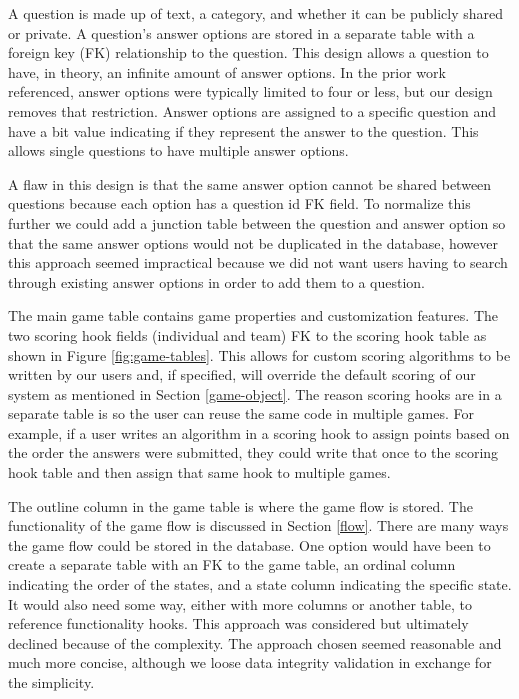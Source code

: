 \documentclass{article}
\begin{document}
    		A question is made up of text, a category, and whether it can be publicly shared or private. A question's answer options are stored in a separate table with a foreign key (FK) relationship to the question. This design allows a question to have, in theory, an infinite amount of answer options. In the prior work referenced, answer options were typically limited to four or less, but our design removes that restriction. Answer options are assigned to a specific question and have a bit value indicating if they represent the answer to the question. This allows single questions to have multiple answer options.
    		\smallskip
    		
    		A flaw in this design is that the same answer option cannot be shared between questions because each option has a question id FK field.  To normalize this further we could add a junction table between the question and answer option so that the same answer options would not be duplicated in the database, however this approach seemed impractical because we did not want users having to search through existing answer options in order to add them to a question.
    		\smallskip
    		
    		The main game table contains game properties and customization features. The two scoring hook fields (individual and team) FK to the scoring hook table as shown in Figure \ref{fig:game-tables}. This allows for custom scoring algorithms to be written by our users and, if specified, will override the default scoring of our system as mentioned in Section \ref{game-object}. The reason scoring hooks are in a separate table is so the user can reuse the same code in multiple games. For example, if a user writes an algorithm in a scoring hook to assign points based on the order the answers were submitted, they could write that once to the scoring hook table and then assign that same hook to multiple games.
    		\smallskip
    		
    		The outline column in the game table is where the game flow is stored. The functionality of the game flow is discussed in Section \ref{flow}. There are many ways the game flow could be stored in the database. One option would have been to create a separate table with an FK to the game table, an ordinal column indicating the order of the states, and a state column indicating the specific state. It would also need some way, either with more columns or another table, to reference functionality hooks. This approach was considered but ultimately declined because of the complexity. The approach chosen seemed reasonable and much more concise, although we loose data integrity validation in exchange for the simplicity.
    		\smallskip
    		
\end{document}

